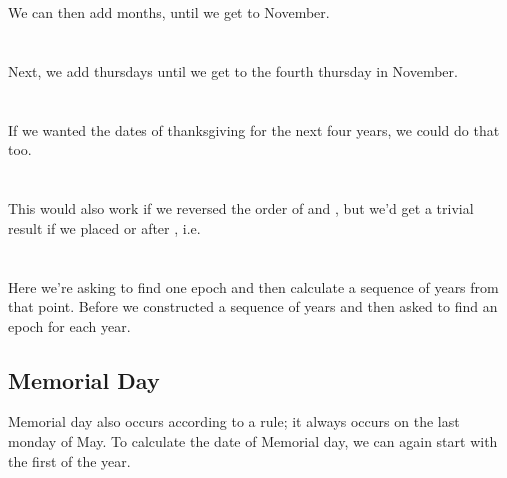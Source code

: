 \documentclass[article]{jss}
\begin{document}
\\
\\

We can then add months, until we get to November.\\

\\
\\

Next, we add thursdays until we get to the fourth thursday in November.\\

\\
\\

If we wanted the dates of thanksgiving for the next four years, we could do that too.\\

\\
\\

This would also work if we reversed the order of  and , but we'd get a trivial result if we placed  or  after , i.e.\\

\\
\\

Here we're asking  to find one epoch and then calculate a sequence of years from that point. Before we constructed a sequence of years and then asked  to find an epoch for each year.

\subsection{Memorial Day}
Memorial day also occurs according to a rule; it always occurs on the last monday of May. To calculate the date of Memorial day, we can again start with the first of the year.\\

\\
\\
\end{document}
